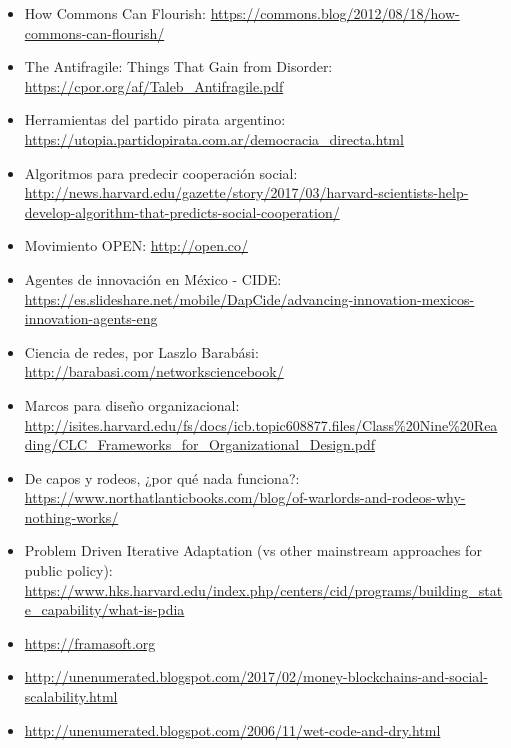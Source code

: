 \begin{itemize}
	\item How Commons Can Flourish: \url{https://commons.blog/2012/08/18/how-commons-can-flourish/}
	\item The Antifragile: Things That Gain from Disorder: \url{https://cpor.org/af/Taleb\_Antifragile.pdf}
	\item Herramientas del partido pirata argentino: \url{https://utopia.partidopirata.com.ar/democracia\_directa.html}
	\item Algoritmos para predecir cooperación social: \url{http://news.harvard.edu/gazette/story/2017/03/harvard-scientists-help-develop-algorithm-that-predicts-social-cooperation/}
	\item Movimiento OPEN: \url{http://open.co/}
	\item Agentes de innovación en México - CIDE: \url{https://es.slideshare.net/mobile/DapCide/advancing-innovation-mexicos-innovation-agents-eng} 
	\item Ciencia de redes, por Laszlo Barabási: \url{http://barabasi.com/networksciencebook/}
	\item Marcos para diseño organizacional: \url{http://isites.harvard.edu/fs/docs/icb.topic608877.files/Class\%20Nine\%20Reading/CLC\_Frameworks\_for\_Organizational\_Design.pdf}
	\item De capos y rodeos, ¿por qué nada funciona?: \url{https://www.northatlanticbooks.com/blog/of-warlords-and-rodeos-why-nothing-works/}
	\item Problem Driven Iterative Adaptation (vs other mainstream approaches for public policy): \url{https://www.hks.harvard.edu/index.php/centers/cid/programs/building\_state\_capability/what-is-pdia}
	\item \url{https://framasoft.org}
	\item \url{http://unenumerated.blogspot.com/2017/02/money-blockchains-and-social-scalability.html}
	\item \url{http://unenumerated.blogspot.com/2006/11/wet-code-and-dry.html}
\end{itemize}